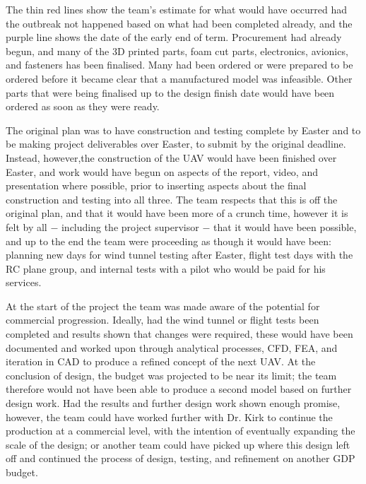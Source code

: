 \documentclass[../../main.tex]{subfiles}
\begin{document}
The thin red lines show the team's estimate for what would have occurred had the outbreak not happened based on what had been completed already, and the purple line shows the date of the early end of term.
Procurement had already begun, and many of the 3D printed parts, foam cut parts, electronics, avionics, and fasteners has been finalised.
Many had been ordered or were prepared to be ordered before it became clear that a manufactured model was infeasible.
Other parts that were being finalised up to the design finish date would have been ordered as soon as they were ready.  


The original plan was to have construction and testing complete by Easter and to be making project deliverables over Easter, to submit by the original deadline.
Instead, however,the construction of the UAV would have been finished over Easter, and work would have begun on aspects of the report, video, and presentation where possible, prior to inserting aspects about the final construction and testing into all three.
The team respects that this is off the original plan, and that it would have been more of a crunch time, however it is felt by all $-$ including the project supervisor $-$ that it would have been possible, and up to the end the team were proceeding as though it would have been: planning new days for wind tunnel testing after Easter, flight test days with the RC plane group, and internal tests with a pilot who would be paid for his services.  

At the start of the project the team was made aware of the potential for commercial progression.
Ideally, had the wind tunnel or flight tests been completed and results shown that changes were required, these would have been documented and worked upon through analytical processes, CFD, FEA, and iteration in CAD to produce a refined concept of the next UAV.
At the conclusion of design, the budget was projected to be near its limit; the team therefore would not have been able to produce a second model based on further design work.
Had the results and further design work shown enough promise, however, the team could have worked further with Dr. Kirk to continue the production at a commercial level, with the intention of eventually expanding the scale of the design; or another team could have picked up where this design left off and continued the process of design, testing, and refinement on another GDP budget. 
\end{document}
